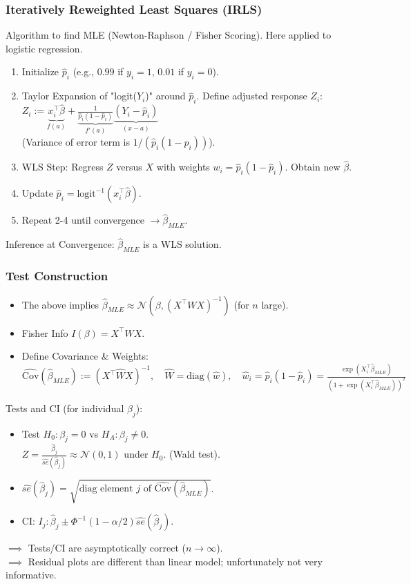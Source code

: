 \subsubsection{Iteratively Reweighted Least Squares (IRLS)}
Algorithm to find MLE (Newton-Raphson / Fisher Scoring). Here applied to logistic regression.

\begin{enumerate}
    \item Initialize $\hat{p}_i$ (e.g., $0.99$ if $y_i=1$, $0.01$ if $y_i=0$).
    \item Taylor Expansion of "logit($Y_i$)" around $\hat{p}_i$. Define adjusted response $Z_i$:
    $Z_i := \underbrace{x_i^\top \hat{\beta}}_{f(a)} + \underbrace{\frac{1}{\hat{p}_i(1-\hat{p}_i)}}_{f'(a)} \underbrace{(Y_i - \hat{p}_i)}_{(x-a)}$
    \\ (Variance of error term is $1/(\hat{p}_i(1-\hat{p}_i))$).
    \item WLS Step: Regress $Z$ versus $X$ with weights $w_i = \hat{p}_i(1-\hat{p}_i)$. Obtain new $\hat{\beta}$.
    \item Update $\hat{p}_i = \text{logit}^{-1}(x_i^\top \hat{\beta})$.
    \item Repeat 2-4 until convergence $\to \hat{\beta}_{MLE}$.
\end{enumerate}

Inference at Convergence:
$\hat{\beta}_{MLE}$ is a WLS solution.
\subsubsection{Test Construction}
\begin{itemize}
    \item The above implies $\hat{\beta}_{MLE} \approx \mathcal{N}(\beta, (X^\top W X)^{-1})$ (for $n$ large).
    \item Fisher Info $I(\beta) = X^\top W X$.
    \item Define Covariance \& Weights:
    $ \widehat{\text{Cov}}(\hat{\beta}_{MLE}) := (X^\top \hat{W} X)^{-1}, \quad \hat{W} = \text{diag}(\hat{w}), \quad \hat{w}_i = \hat{p}_i(1-\hat{p}_i) = \frac{\exp(X_i^\top \hat{\beta}_{MLE})}{(1 + \exp(X_i^\top \hat{\beta}_{MLE}))^2}$
\end{itemize}

Tests and CI (for individual $\beta_j$):
\begin{itemize}
    \item Test $H_0: \beta_j = 0$ vs $H_A: \beta_j \neq 0$.
    \\ $Z = \frac{\hat{\beta}_j}{\widehat{se}(\hat{\beta}_j)} \approx \mathcal{N}(0,1)$ under $H_0$. (Wald test).
    \item $\widehat{se}(\hat{\beta}_j) = \sqrt{\text{diag element } j \text{ of } \widehat{\text{Cov}}(\hat{\beta}_{MLE})}$.
    \item CI: $I_j: \hat{\beta}_j \pm \Phi^{-1}(1-\alpha/2)\widehat{se}(\hat{\beta}_j)$.
\end{itemize}
$\implies$ Tests/CI are asymptotically correct ($n \to \infty$).
\\ $\implies$ Residual plots are different than linear model; unfortunately not very informative.

